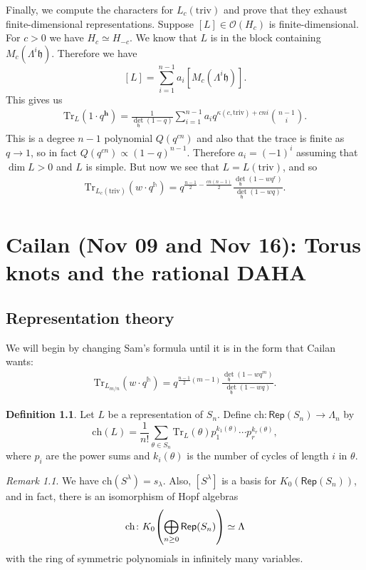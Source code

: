 \documentclass[leqno, openany]{memoir}
\theoremstyle{definition}
\newtheorem{defn}[thm]{Definition}
\theoremstyle{remark}
\newtheorem{rmk}[thm]{Remark}
\theoremstyle{plain}
\theoremstyle{definition}
\theoremstyle{remark}
\newcommand{\h}{\mathfrak{h}}
\newcommand{\mc}[1]{\mathcal{#1}}
\newcommand{\mr}[1]{\mathrm{#1}}
\newcommand{\ms}[1]{\mathsf{#1}}
\newcommand{\1}{\mathbf{1}}
\newcommand{\2}{\mathbf{2}}
\newcommand{\3}{\mathbf{3}}
\begin{document}
Finally, we compute the characters for $L_c(\mr{triv})$ and prove that they exhaust finite-dimensional representations. Suppose $[L] \in \mc{O}(H_c)$ is finite-dimensional. For $c > 0$ we have $H_c \simeq H_{-c}$. We know that $L$ is in the block containing $M_c(\Lambda^i \h)$. Therefore we have
\[ [L] = \sum_{i=1}^{n-1} a_i [M_c(\Lambda^i \h)]. \]
This gives us
\begin{align*}
    \mr{Tr}_L(1 \cdot q^{\mathbf{h}}) = \frac{1}{\det_{\h}(1-q)} \sum_{i=1}^{n-1} a_i q^{\kappa(c, \mr{triv}) + cni} \binom{n-1}{i}.
\end{align*}
This is a degree $n-1$ polynomial $Q(q^{cn})$ and also that the trace is finite as $q \to 1$, so in fact $Q(q^{cn}) \propto (1-q)^{n-1}$. Therefore $a_i = {(-1)}^i$ assuming that $\dim L > 0$ and $L$ is simple. But now we see that $L = L(\mr{triv})$, and so
\begin{align*}
    \mr{Tr}_{L_c(\mr{triv})} (w \cdot q^{\mathbb{h}}) = q^{\frac{n-1}{2} - \frac{cn(n-1)}{2}} \frac{\det_{\h} (1-wq^r)}{\det_{\h}(1-wq)}.
\end{align*}

\chapter{Cailan (Nov 09 and Nov 16): Torus knots and the rational DAHA}%
\label{cha:cailan_nov_09_torus_knots_and_the_rational_daha}

\section{Representation theory}%
\label{sec:representation_theory}

We will begin by changing Sam's formula until it is in the form that Cailan wants:
\begin{align*}
    \mr{Tr}_{L_{m/n}} (w \cdot q^{\mathbb{h}}) = q^{\frac{n-1}{2}(m-1)} \frac{\det_{\h} (1-wq^m)}{\det_{\h}(1-wq)}.
\end{align*}

\begin{defn}
    Let $L$ be a representation of $S_n$. Define $\mr{ch} \colon \ms{Rep}(S_n) \to \Lambda_n$ by
    \[ \mr{ch}(L) = \frac{1}{n!} \sum_{\theta \in S_n} \mr{Tr}_L(\theta) p_1^{k_1(\theta)} \cdots p_r^{k_r(\theta)}, \]
    where $p_i$ are the power sums and $k_i(\theta)$ is the number of cycles of length $i$ in $\theta$.
\end{defn}

\begin{rmk}
    We have $\mr{ch}(S^{\lambda}) = s_{\lambda}$. Also, $[S^{\lambda}]$ is a basis for $K_0(\ms{Rep}(S_n))$, and in fact, there is an isomorphism of Hopf algebras
    \[ \mr{ch} \colon K_0\qty( \bigoplus_{n \geq 0}\ms{Rep}(S_n)) \simeq \Lambda \]
    with the ring of symmetric polynomials in infinitely many variables.
\end{rmk}
\end{document}
